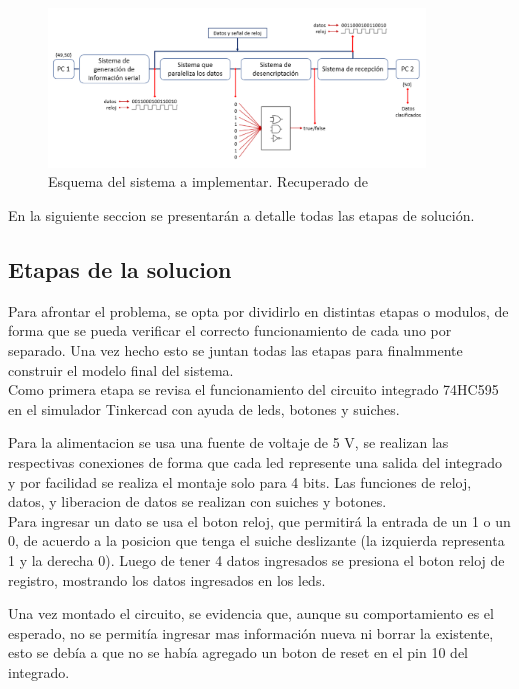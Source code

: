 \documentclass{article}
\begin{document}
\begin{figure}[!ht]
\includegraphics[width=10cm]{esquema.PNG}
\centering
\caption{Esquema del sistema a implementar. Recuperado de \cite{augusto}}
\end{figure}

En la siguiente seccion se presentarán a detalle todas las etapas de solución.

\subsection{Etapas de la solucion}
Para afrontar el problema, se opta por dividirlo en distintas etapas o modulos, de forma que se pueda verificar el correcto funcionamiento de cada uno por separado. Una vez hecho esto se juntan todas las etapas para finalmmente construir el modelo final del sistema.\\

Como primera etapa se revisa el funcionamiento del circuito integrado 74HC595 en el simulador Tinkercad con ayuda de leds, botones y suiches. 

Para la alimentacion se usa una fuente de voltaje de 5 V, se realizan las respectivas conexiones de forma que cada led represente una salida del integrado y por facilidad se realiza el montaje solo para 4 bits. Las funciones de reloj, datos, y liberacion de datos se realizan con suiches y botones.\\

Para ingresar un dato se usa el boton reloj, que permitirá la entrada de un 1 o un 0, de acuerdo a la posicion que tenga el suiche deslizante (la izquierda representa 1 y la derecha 0). Luego de tener 4 datos ingresados se presiona el boton reloj de registro, mostrando los datos ingresados en los leds.

Una vez montado el circuito, se evidencia que, aunque su comportamiento es el esperado, no se permitía ingresar mas información nueva ni borrar la existente, esto se debía a que no se había agregado un boton de reset en el pin 10 del integrado.
\end{document}
